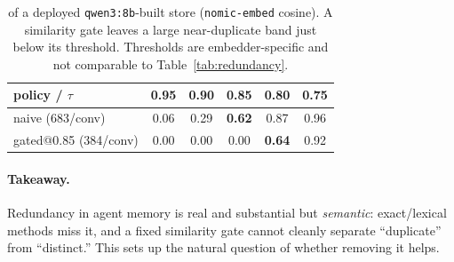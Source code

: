 \begin{table}[t]
\centering
\small
\begin{tabular}{lccccc}
\toprule
policy / $\tau$ & 0.95 & 0.90 & 0.85 & 0.80 & 0.75 \\
\midrule
naive (683/conv) & 0.06 & 0.29 & \textbf{0.62} & 0.87 & 0.96 \\
gated@0.85 (384/conv) & 0.00 & 0.00 & 0.00 & \textbf{0.64} & 0.92 \\
\bottomrule
\end{tabular}
\caption{\mdr{} of a deployed \texttt{qwen3:8b}-built store (\texttt{nomic-embed}
cosine). A similarity gate leaves a large near-duplicate band just below its
threshold. Thresholds are embedder-specific and not comparable to
Table~\ref{tab:redundancy}.}
\label{tab:store}
\end{table}

\paragraph{Takeaway.} Redundancy in agent memory is real and substantial but
\emph{semantic}: exact/lexical methods miss it, and a fixed similarity gate
cannot cleanly separate ``duplicate'' from ``distinct.'' This sets up the
natural question of whether removing it helps.
